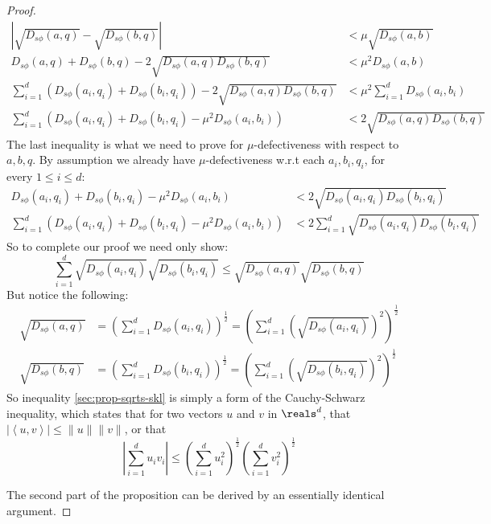 \documentclass[11pt]{myclass}
\newcommand{\sbreg}{\ensuremath{D_{s\phi}}}
\begin{document}
\begin{proof}
\begin{align*}
\left| \sqrt{\sbreg(a, q)} - \sqrt{\sbreg(b,q)} \right| &< \mu \sqrt{\sbreg(a, b)} 
\\ \sbreg(a,q) + \sbreg(b,q) - 2 \sqrt{\sbreg(a,q) \sbreg(b,q)}  &< \mu^2 \sbreg(a,b) 
\\ \sum_{i=1}^{d} \left(\sbreg(a_i,q_i) + \sbreg(b_i, q_i)\right) - 2 \sqrt{\sbreg(a,q) \sbreg(b,q)} &< \mu^2 \sum_{i=1}^{d} \sbreg(a_i,b_i) 
\\ \sum_{i=1}^{d} \left(\sbreg(a_i, q_i) + \sbreg(b_i,q_i) - \mu^2 \sbreg(a_i,b_i)\right) &< 2 \sqrt{\sbreg (a,q)\sbreg(b,q)}
\end{align*}
The last inequality is what we need to prove for $\mu$-defectiveness with respect to  $a,b,q$.
By assumption we already have $\mu$-defectiveness w.r.t each $a_i,b_i, q_i$, for every $1 \leq i \leq d$: 
\begin{align*}
 \sbreg(a_i,q_i) + \sbreg(b_i,q_i) - \mu^2 \sbreg(a_i,b_i) &< 2 \sqrt{\sbreg(a_i,q_i) \sbreg(b_i,q_i)} 
\\ \sum_{i=1}^{d} \left(  \sbreg(a_i,q_i) + \sbreg(b_i,q_i) - \mu^2 \sbreg(a_i,b_i) \right) 
&< 2 \sum_{i=1}^{d} \sqrt{\sbreg(a_i,q_i) \sbreg(b_i,q_i)} 
\end{align*}
So to complete our proof we need only show:
\begin{equation}\label{sec:prop-sqrts-skl}
\sum_{i=1}^{d} \sqrt{\sbreg(a_i,q_i)} \sqrt{\sbreg(b_i,q_i)} \leq \sqrt{\sbreg(a,q)}\sqrt{\sbreg(b,q)} 
\end{equation}
But notice the following:
\begin{align*}
\sqrt{\sbreg(a,q)} &= \left( \sum_{i=1}^{d}\sbreg(a_i,q_i) \right)^{\frac{1}{2}} 
                   = \left( \sum_{i=1}^{d} \left( \sqrt{\sbreg(a_i,q_i)} \right)^2 \right)^{\frac{1}{2}}
\\ \sqrt{\sbreg(b,q)} &= \left( \sum_{i=1}^{d}\sbreg(b_i,q_i) \right)^{\frac{1}{2}}
                      = \left( \sum_{i=1}^{d} \left( \sqrt{\sbreg(b_i,q_i)} \right)^2 \right)^{\frac{1}{2}}
\end{align*}
So inequality \ref{sec:prop-sqrts-skl} is simply a form of the Cauchy-Schwarz inequality, which states that for two vectors $u$ and $v$ in $\reals^d$, that $\left|\left< u, v \right>\right| \leq \|u\| \|v\|$, or that
\begin{equation*}
  \left| \sum_{i=1}^d u_iv_i \right| \leq 
    \left( \sum_{i=1}^du_i^2 \right)^{\frac{1}{2}} 
    \left( \sum_{i=1}^dv_i^2 \right)^{\frac{1}{2}}
\end{equation*}

The second part of the proposition can be derived by an essentially identical argument.
\end{proof}
\end{document}
